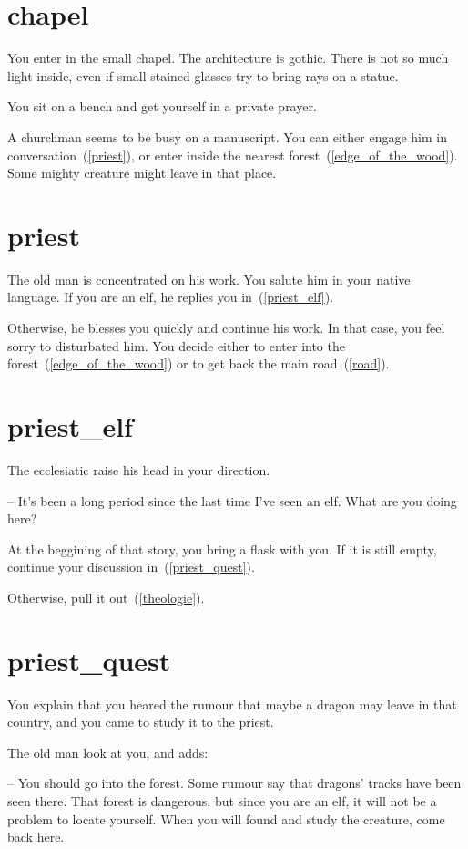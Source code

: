 \section{chapel}

You enter in the small chapel. The architecture is gothic. There is not so much
light inside, even if small stained glasses try to bring rays on a statue.

You sit on a bench and get yourself in a private prayer.

A churchman seems to be busy on a manuscript. You can either engage him in
conversation~(\ref{priest}), or enter inside the nearest
forest~(\ref{edge_of_the_wood}). Some mighty creature might leave in that place.

\section{priest}

The old man is concentrated on his work. You salute him in your native language.
If you are an elf, he replies you in~(\ref{priest_elf}).

Otherwise, he blesses you quickly and continue his work. In that case, you feel
sorry to disturbated him. You decide either to enter into the
forest~(\ref{edge_of_the_wood}) or to get back the main road~(\ref{road}).

\section{priest_elf}

The ecclesiatic raise his head in your direction.

-- It's been a long period since the last time I've seen an elf. What are you
doing here?

At the beggining of that story, you bring a flask with you. If it is still
empty, continue your discussion in~(\ref{priest_quest}).

Otherwise, pull it
out~(\ref{theologie}).

\section{priest_quest}

You explain that you heared the rumour that maybe a dragon may leave in that
country, and you came to study it to the priest.

The old man look at you, and adds:

-- You should go into the forest. Some rumour say that dragons' tracks have been
seen there. That forest is dangerous, but since you are an elf, it will not be a
problem to locate yourself. When you will found and study the creature, come
back here.

